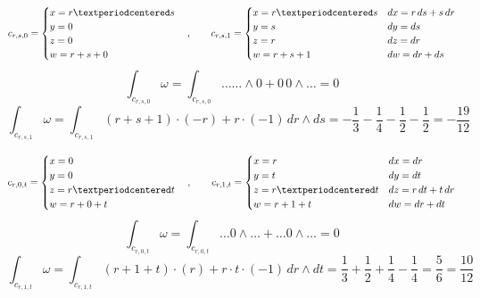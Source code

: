 \documentclass[12pt]{article}					%
\begin{document}
\begin{priklad}[1.]

        \begin{reseni}
            $$ c_{r, s, 0} = \begin{cases} x = r·s \\ y = 0 \\ z = 0 \\ w = r + s + 0 \end{cases}, \hskip 2em
            c_{r, s, 1} = \begin{cases} x = r·s & dx = r\,ds + s\,dr \\ y = s & dy = ds \\ z = r & dz = dr \\ w = r + s + 1 & dw = dr + ds \end{cases} $$
            $$ \int_{c_{r, s, 0}}\omega = \int_{c_{r, s, 0}}… …\wedge 0 + 0\,0\wedge… = 0 $$ 
            $$ \int_{c_{r, s, 1}}\omega = \int_{c_{r, s, 1}}(r+s+1)·(-r) + r·(-1)\, dr\wedge ds = -\frac{1}{3} - \frac{1}{4} - \frac{1}{2} - \frac{1}{2} = -\frac{19}{12} $$ 

            $$ c_{r, 0, t} = \begin{cases} x = 0 \\ y = 0 \\ z = r·t \\ w = r + 0 + t \end{cases}, \hskip 2em
            c_{r, 1, t} = \begin{cases} x = r & dx = dr \\ y = t & dy = dt \\ z = r·t & dz = r\,dt + t\,dr \\ w = r + 1 + t & dw = dr + dt \end{cases} $$
            $$ \int_{c_{r, 0, t}}\omega = \int_{c_{r, 0, t}}… 0\wedge … + … 0\wedge… = 0 $$ 
            $$ \int_{c_{r, 1, t}}\omega = \int_{c_{r, 1, t}}(r+1+t)·(r) + r·t·(-1)\, dr\wedge dt = \frac{1}{3} + \frac{1}{2} + \frac{1}{4} - \frac{1}{4} = \frac{5}{6} = \frac{10}{12} $$


\end{reseni}
\end{priklad}
\end{document}

